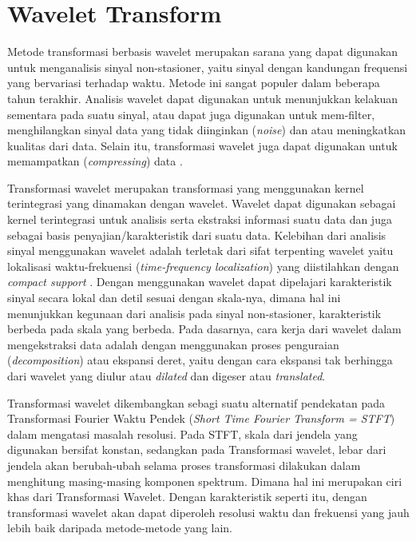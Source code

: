\section{Wavelet Transform}
\label{sec:wt}

Metode transformasi berbasis wavelet merupakan sarana yang dapat digunakan untuk
menganalisis sinyal non-stasioner, yaitu sinyal dengan kandungan frequensi yang
bervariasi terhadap waktu. Metode ini sangat populer dalam beberapa tahun
terakhir. Analisis wavelet dapat digunakan untuk menunjukkan kelakuan sementara
pada suatu sinyal, atau dapat juga digunakan untuk mem-filter, menghilangkan
sinyal data yang tidak diinginkan (\emph{noise}) dan atau meningkatkan kualitas
dari data. Selain itu, transformasi wavelet juga dapat digunakan untuk
memampatkan (\emph{compressing}) data \cite{Agfi:2006}.

Transformasi wavelet merupakan transformasi yang menggunakan kernel terintegrasi
yang dinamakan dengan wavelet. Wavelet dapat digunakan sebagai kernel
terintegrasi untuk analisis serta ekstraksi informasi suatu data dan juga
sebagai basis penyajian/karakteristik dari suatu data. Kelebihan dari analisis
sinyal menggunakan wavelet adalah terletak dari sifat terpenting wavelet yaitu
lokalisasi waktu-frekuensi (\emph{time-frequency localization}) yang
diistilahkan dengan \emph{compact support} \cite{Guler:2005}. Dengan menggunakan
wavelet dapat dipelajari karakteristik sinyal secara lokal dan detil sesuai
dengan skala-nya, dimana hal ini menunjukkan kegunaan dari analisis pada sinyal
non-stasioner, karakteristik berbeda pada skala yang berbeda. Pada dasarnya,
cara kerja dari wavelet dalam mengekstraksi data adalah dengan menggunakan
proses penguraian (\emph{decomposition}) atau ekspansi deret, yaitu dengan cara
ekspansi tak berhingga dari wavelet yang diulur atau \emph{dilated} dan digeser
atau \emph{translated}.

Transformasi wavelet dikembangkan sebagi suatu alternatif pendekatan pada
Transformasi Fourier Waktu Pendek (\emph{Short Time Fourier Transform = STFT})
dalam mengatasi masalah resolusi. Pada STFT, skala dari jendela yang
digunakan bersifat konstan, sedangkan pada Transformasi wavelet, lebar dari
jendela akan berubah-ubah selama proses transformasi dilakukan dalam menghitung
masing-masing komponen spektrum. Dimana hal ini merupakan ciri khas dari
Transformasi Wavelet. Dengan karakteristik seperti itu, dengan transformasi
wavelet akan dapat diperoleh resolusi waktu dan frekuensi yang jauh lebih baik
daripada metode-metode yang lain.

